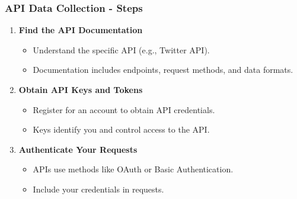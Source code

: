 \documentclass{beamer}
\begin{document}
\begin{frame}[fragile]
    \frametitle{API Data Collection - Steps}
    \begin{enumerate}
        \item \textbf{Find the API Documentation}
        \begin{itemize}
            \item Understand the specific API (e.g., Twitter API).
            \item Documentation includes endpoints, request methods, and data formats.
        \end{itemize}

        \item \textbf{Obtain API Keys and Tokens}
        \begin{itemize}
            \item Register for an account to obtain API credentials.
            \item Keys identify you and control access to the API.
        \end{itemize}

        \item \textbf{Authenticate Your Requests}
        \begin{itemize}
            \item APIs use methods like OAuth or Basic Authentication.
            \item Include your credentials in requests.
        \end{itemize}
    \end{enumerate}
\end{frame}
\end{document}
